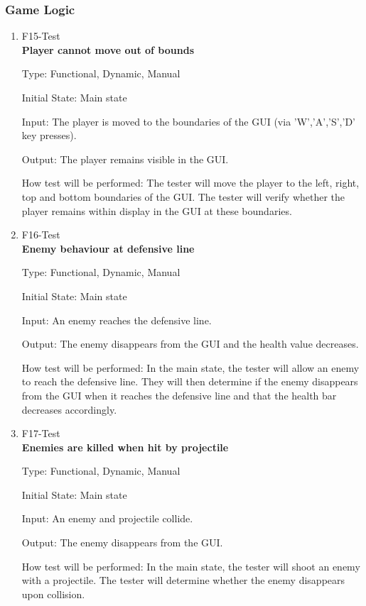 \documentclass[12pt, titlepage]{article}
\begin{document}
\subsubsection{Game Logic}
\begin{enumerate}
\item{F15-Test} \\
\textbf{Player cannot move out of bounds}

Type: Functional, Dynamic, Manual
					
Initial State: Main state
					
Input: The player is moved to the boundaries of the GUI (via 'W','A','S','D' key presses).
					
Output: The player remains visible in the GUI.
					
How test will be performed: The tester will move the player to the left, right, top and bottom boundaries of the GUI.  The tester will verify whether the player remains within display in the GUI at these boundaries.

\item{F16-Test} \\
\textbf{Enemy behaviour at defensive line}

Type: Functional, Dynamic, Manual
					
Initial State: Main state
					
Input: An enemy reaches the defensive line.
					
Output: The enemy disappears from the GUI and the health value decreases.
					
How test will be performed: In the main state, the tester will allow an enemy to reach the defensive line.  They will then determine if the enemy disappears from the GUI when it reaches the defensive line and that the health bar decreases accordingly.

\item{F17-Test} \\
\textbf{Enemies are killed when hit by projectile}

Type: Functional, Dynamic, Manual
					
Initial State: Main state
					
Input: An enemy and projectile collide.
					
Output: The enemy disappears from the GUI.
					
How test will be performed: In the main state, the tester will shoot an enemy with a projectile.  The tester will determine whether the enemy disappears upon collision.


\end{enumerate}
\end{document}
